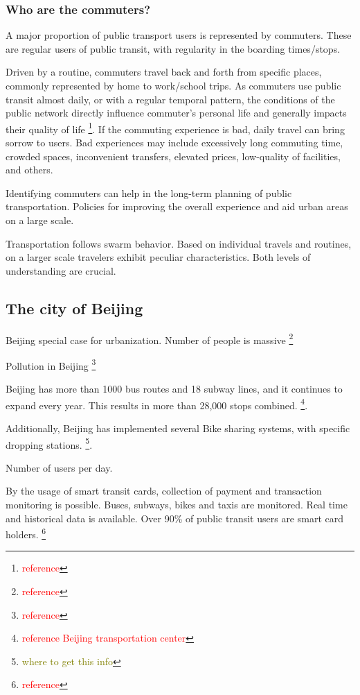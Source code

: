 \documentclass{article}
\newcommand{\selfnote}[1]{\footnote{\textcolor{red}{#1}}}
\newcommand{\Liangdoubt}[1]{\footnote{\textcolor{olive}{#1}}}
\begin{document}
\subsubsection{Who are the commuters?}
A major proportion of public transport users is represented by commuters. These are regular users of public transit, with regularity in the boarding times/stops. 

Driven by a routine, commuters travel back and forth from specific places, commonly represented by home to work/school trips. As commuters use public transit almost daily, or with a regular temporal pattern, the  conditions of the public network directly influence commuter's personal life and generally impacts their quality of life \selfnote{reference}. If the commuting experience is bad, daily travel can bring sorrow to users. Bad experiences may include excessively long commuting time, crowded spaces, inconvenient transfers, elevated prices, low-quality of facilities, and others. 

Identifying commuters can help in the long-term planning of public transportation. Policies for improving the overall experience and aid urban areas on a large scale.

Transportation follows swarm behavior. Based on individual travels and routines, on a larger scale travelers exhibit peculiar characteristics. Both levels of understanding are crucial.   

\subsection{The city of Beijing}
Beijing special case for urbanization. Number of people is massive \selfnote{reference}

Pollution in Beijing \selfnote{reference}

Beijing has more than 1000 bus routes and 18 subway lines, and it continues to expand every year. This results in more than 28,000 stops combined. \selfnote{reference Beijing transportation center}. 

Additionally, Beijing has implemented several Bike sharing systems, with specific dropping stations. \Liangdoubt{where to get this info}.

Number of users per day.

By the usage of smart transit cards, collection of payment and transaction monitoring is possible. Buses, subways, bikes and taxis are monitored. Real time and historical data is available. Over 90\% of public transit users are smart card holders. \selfnote{reference}
\end{document}
